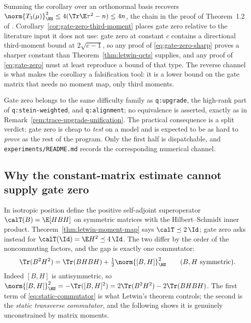 \documentclass[../../main.tex]{subfiles}
\begin{document}
Summing the corollary over an orthonormal basis recovers
$\norm{T_3(\mu)}_{\HS}^2\le4(\Tr\E\tau^2-n)\le4n$, the chain in the proof of Theorem~1.2 of
\cite{ChenKlartag2026SharpThinShell}.
Corollary~\ref{cor:gate-zero-third-moment} places gate zero relative to the literature
input it does not use: gate zero at constant $c$ contains a directional third-moment bound at
$2\sqrt{c-1}$, so any proof of \eqref{eq:gate-zero-sharp} proves a sharper constant than
Theorem~\ref{thm:letwin-qcts} supplies, and any proof of \eqref{eq:gate-zero} must at least
reproduce a bound of that type. The reverse channel is what makes the corollary a
falsification tool: it is a lower bound on the gate matrix that needs no moment map, only
third moments.

\begin{remark}
Gate zero belongs to the same difficulty family as \texttt{q:upgrade}, the high-rank part of
\texttt{q:stein-weighted}, and \texttt{q:alignment}; no equivalence is asserted, exactly as in
Remark~\ref{rem:trace-upgrade-unification}. The practical consequence is a split verdict:
gate zero is cheap to \emph{test} on a model and is expected to be as hard to \emph{prove} as
the rest of the program. Only the first half is dispatchable, and
\texttt{experiments/README.md} records the corresponding numerical channel.
\end{remark}

\subsection{Why the constant-matrix estimate cannot supply gate zero}
\label{subsec:gate-zero-countermodel}

In isotropic position define the positive self-adjoint superoperator $\calT(B)=\E[HBH]$ on
symmetric matrices with the Hilbert--Schmidt inner product.
Theorem~\ref{thm:letwin-moment-map} says $\calT\preceq2\,\Id$; gate zero asks instead for
$\calT(\Id)=\E H^2\preceq4\,\Id$. The two differ by the order of the noncommuting factors, and
the gap is exactly one commutator:
\begin{equation}
  \Tr(B^2H^2)=\Tr(BHBH)+\tfrac12\norm{[B,H]}_{\HS}^2
  \qquad(B,H\ \text{symmetric}).
  \label{eq:static-commutator}
\end{equation}
Indeed $[B,H]$ is antisymmetric, so
$\norm{[B,H]}_{\HS}^2=-\Tr([B,H]^2)=2\Tr(B^2H^2)-2\Tr(BHBH)$. The first term of
\eqref{eq:static-commutator} is what Letwin's theorem controls; the second is the \emph{static
transverse commutator}, and the following shows it is genuinely unconstrained by matrix moments.
\end{document}
